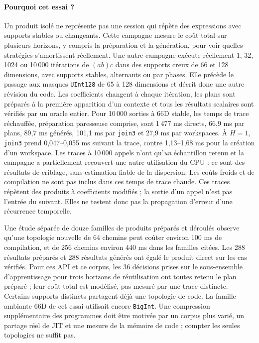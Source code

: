 \documentclass[11pt,a4paper]{article}
\newcommand{\code}[1]{\texttt{#1}}
\begin{document}
\paragraph{Pourquoi cet essai ?}
Un produit isolé ne représente pas une session qui répète des expressions
avec supports stables ou changeants. Cette campagne mesure le coût total
sur plusieurs horizons, y compris la préparation et la génération,
pour voir quelles stratégies s'amortissent réellement.
Une autre campagne exécute réellement 1, 32, 1024 ou 10\,000 itérations de
$(ab)c$ dans des supports creux de 66 et 128 dimensions, avec supports stables,
alternants ou par phases. Elle précède le passage aux masques \code{UInt128}
de 65 à 128 dimensions et décrit donc une autre révision du code. Les
coefficients changent à chaque itération, les plans sont préparés à la
première apparition d'un contexte et tous les
résultats scalaires sont vérifiés par un oracle entier. Pour 10\,000 sorties à
66D stable, les temps de trace réchauffée, préparation paresseuse comprise,
sont 1\,477 ms directs, 66,9 ms par plans, 89,7 ms générés, 101,1 ms par
\code{join3} et 27,9 ms par workspaces. À $H=1$, \code{join3} prend 0,047--0,055
ms suivant la trace, contre 1,13--1,68 ms pour la création d'un workspace.
Les traces à 10\,000 appels n'ont qu'\emph{un} échantillon retenu et la
campagne a partiellement recouvert une autre utilisation du CPU : ce sont des
résultats de criblage, sans estimation fiable de la dispersion. Les coûts
froids et de compilation ne sont pas inclus dans ces temps de trace chaude.
Ces traces répètent des produits à coefficients modifiés ; la sortie d'un
appel n'est pas l'entrée du suivant. Elles ne testent donc pas la propagation
d'erreur d'une récurrence temporelle.

Une étude séparée de douze familles de produits préparés et déroulés observe
qu'une topologie nouvelle de 64 chemins peut coûter environ 100 ms de
compilation, et de 256 chemins environ 440 ms dans les familles citées. Les
288 résultats préparés et 288 résultats générés ont égalé le produit direct
sur les cas vérifiés. Pour ces API et ce corpus, les 36 décisions prises sur
le sous-ensemble d'apprentissage pour trois horizons de réutilisation ont toutes
retenu le plan préparé ; leur coût total est modélisé, pas mesuré par une trace
distincte. Certains supports distincts partagent déjà une topologie de code.
La famille ambiante 66D de cet essai utilisait encore \code{BigInt}. Une
compression supplémentaire des programmes doit être motivée par un corpus
plus varié, un partage réel de JIT et une mesure de la mémoire de code ;
compter les seules topologies ne suffit pas.
\FloatBarrier
\end{document}
